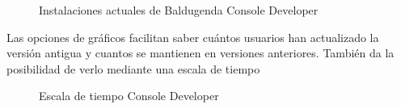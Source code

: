 \begin{figure}[H] 
  \begin{center} 
    \caption{Instalaciones actuales de Baldugenda Console Developer} 
    \label{fig:InstalacionesActuales} 
  \end{center} 
\end{figure}

Las opciones de gráficos facilitan saber cuántos usuarios han actualizado la versión antigua y cuantos se mantienen en versiones anteriores. 
También da la posibilidad de verlo mediante una escala de tiempo

\begin{figure}[H] 
  \begin{center} 
    \caption{Escala de tiempo Console Developer} 
    \label{fig:EscalaTiempo} 
  \end{center} 
\end{figure}

